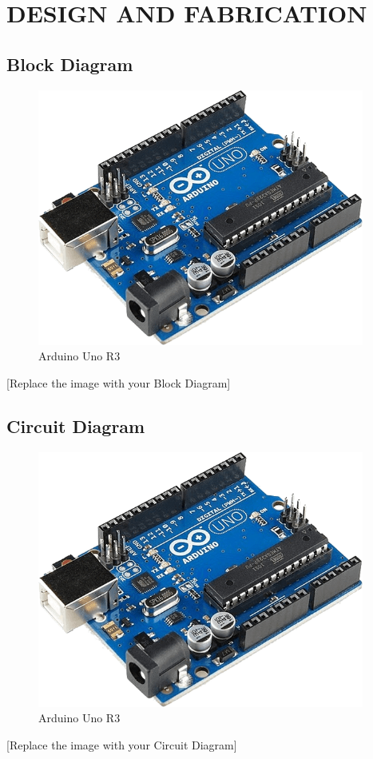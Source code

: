 
       \newpage
\chapter{DESIGN AND FABRICATION}


  

\begin{center}
    \section{Block Diagram}
\end{center}
\begin{figure}[H]
	\centering
	\includegraphics[width=10.75cm,height=8.44cm]{./images/image2.png}
        \caption{Arduino Uno R3}
	\end{figure}
\begin{center}
    [Replace the image with your Block Diagram]
\end{center}
   
        \newpage
  \begin{center}
      \section{Circuit Diagram}
  \end{center}
  \begin{figure}[H]
	\centering
	\includegraphics[width=10.75cm,height=8.44cm]{./images/image2.png}
        \caption{Arduino Uno R3}
	\end{figure}
 \begin{center}
     [Replace the image with your Circuit Diagram]
 \end{center}

